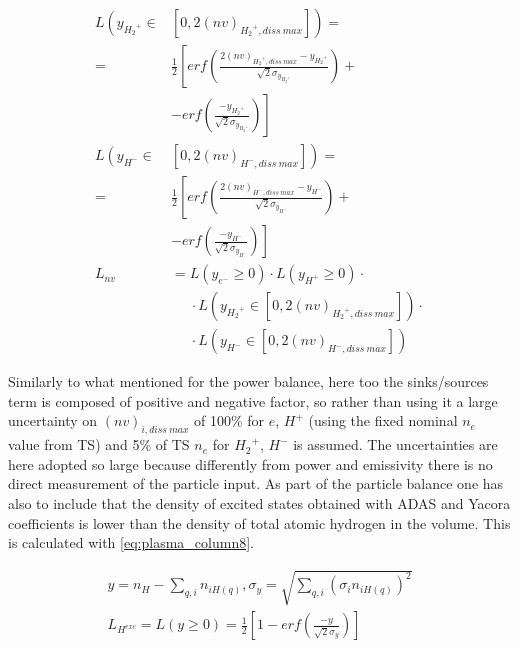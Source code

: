 \begin{equation}
\label{eq:plasma_column7b}
\begin{aligned}
L\left(y_{{H_2}^+{}} \in \right. & \left. [0,2(nv)_{{H_2}^+{}, diss \: max}]\right) = \\ =& \frac{1}{2} \left[ erf \left(\frac{2(nv)_{{H_2}^+{}, diss \: max}-y_{{H_2}^+{}}}{\sqrt{2} {\sigma}_{y_{{H_2}^+{}}} } \right) \right. +\\ &-\left. erf \left(\frac{-y_{{H_2}^+{}}}{\sqrt{2} {\sigma}_{y_{{H_2}^+{}}} } \right) \right]
\\
L\left(y_{{H}^-{}} \in \right. & \left. [0,2(nv)_{{H}^-{}, diss \: max}]\right) = \\ =& \frac{1}{2} \left[ erf\left(\frac{2(nv)_{{H}^-{}, diss \: max}-y_{{H}^-{}}}{\sqrt{2} {\sigma}_{y_{{H}^-{}}} } \right) \right. +\\ &- \left. erf\left(\frac{-y_{{H}^-{}}}{\sqrt{2} {\sigma}_{y_{{H}^-{}}} } \right) \right]
\\
L_{nv} &= L(y_{e^-{}} \geq 0) \cdot L(y_{H^+{}} \geq 0) \cdot \\ & \phantom{=} \cdot L(y_{{H_2}^+{}} \in [0,2(nv)_{{H_2}^+{}, diss \: max}]) \cdot \\ & \phantom{=} \cdot L(y_{{H}^-{}} \in [0,2(nv)_{{H}^-{}, diss \: max}]) 
\end{aligned}
\end{equation}

Similarly to what mentioned for the power balance, here too the sinks/sources term is composed of positive and negative factor, so rather than using it a large uncertainty on $(nv)_{i, diss \: max}$ of 100\% for $e$, $H^+$ (using the fixed nominal $n_e$ value from TS) and 5\% of TS $n_e$ for ${H_2}^+$, $H^-$ is assumed. The uncertainties are here adopted so large because differently from power and emissivity there is no direct measurement of the particle input.
As part of the particle balance one has also to include that the density of excited states obtained with ADAS and Yacora coefficients is lower than the density of total atomic hydrogen in the volume. This is calculated with \autoref{eq:plasma_column8}.

\begin{equation}
\label{eq:plasma_column8}
\begin{aligned}
y = n_{H} - \sum_{q,i} n_{i H(q)}, \sigma_{y} = \sqrt{ \sum_{q,i} (\sigma_i n_{i H(q)})^2  }
\\
L_{H^{exc}} = L(y \geq 0) = \frac{1}{2} \left[ 1 - erf\left(\frac{-{y}}{ \sqrt{2} \sigma_{y} } \right) \right]
\end{aligned}
\end{equation}

